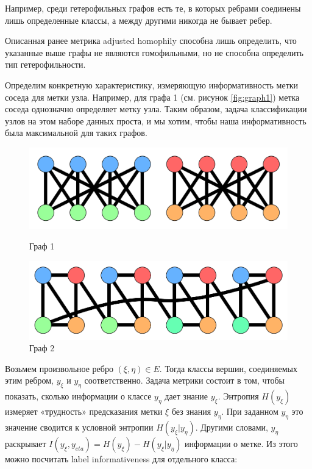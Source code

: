 \documentclass[a4paper,14pt]{article}
\begin{document}
	
	Например, среди гетерофильных графов есть те, в которых ребрами соединены лишь определенные классы, а между другими никогда не бывает ребер.
	
	Описанная ранее метрика adjusted homophily способна лишь определить, что указанные выше графы не являются гомофильными, но не способна определить тип гетерофильности.
	
	Определим конкретную характеристику, измеряющую информативность метки соседа для метки узла.
	Например, для графа 1 (см. рисунок \ref{fig:graph1}) метка соседа однозначно определяет метку узла.
	Таким образом, задача классификации узлов на этом наборе данных проста, и мы хотим, чтобы наша информативность была максимальной для таких графов.
	
	\begin{figure}[H]
		\centering
		\hfill
		\begin{minipage}[b]{0.4\textwidth}
			\includegraphics[width=\textwidth]{images/graph_1}
			\caption{Граф 1}
			\label{fig:graph1}
		\end{minipage}
		\hfill
		\begin{minipage}[b]{0.4\textwidth}
			\includegraphics[width=\textwidth]{images/graph_2}
			\caption{Граф 2}
			\label{fig:graph2}
		\end{minipage}
	\hfill
	\end{figure}
	
	
	Возьмем произвольное ребро $ (\xi, \eta) \in E $. Тогда классы вершин, соединяемых этим ребром, $y_{\xi}$ и $y_{\eta} $ соответственно.
	Задача метрики состоит в том, чтобы показать, сколько информации о классе $ y_{\eta} $ дает знание $ y_{\xi} $.
	Энтропия $ H(y_{\xi}) $ измеряет «трудность» предсказания метки $ \xi $ без знания $ y_{\eta} $.
	При заданном $ y_{\eta} $ это значение сводится к условной энтропии $ H(y_{\xi}|y_{\eta}) $.
	Другими словами, $ y_{\eta} $ раскрывает $ I(y_{\xi},y_{eta}) = H(y_{\xi}) − H(y_{\xi}|y_{\eta}) $ информации о метке.
	Из этого можно посчитать label informativeness для отдельного класса:
	
\end{document}
